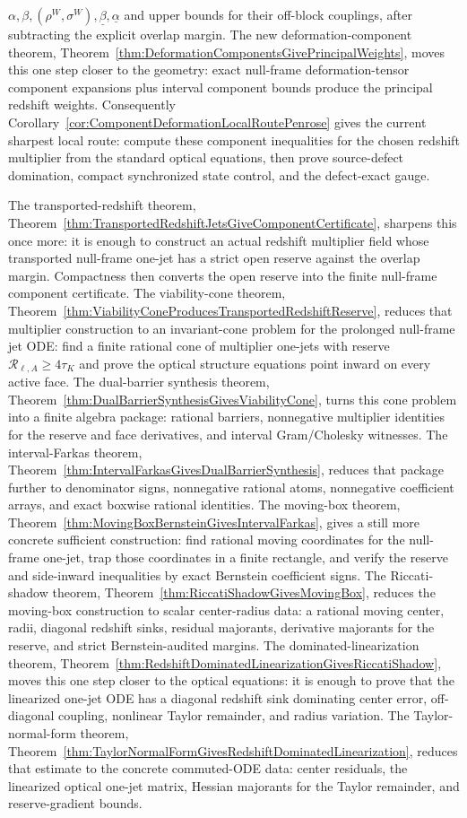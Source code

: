 $\alpha,\beta,(\rho^W,\sigma^W),\underline\beta,\underline\alpha$ and upper bounds for their off-block couplings, after subtracting the explicit overlap margin. The new deformation-component theorem, Theorem~\ref{thm:DeformationComponentsGivePrincipalWeights}, moves this one step closer to the geometry: exact null-frame deformation-tensor component expansions plus interval component bounds produce the principal redshift weights. Consequently Corollary~\ref{cor:ComponentDeformationLocalRoutePenrose} gives the current sharpest local route: compute these component inequalities for the chosen redshift multiplier from the standard optical equations, then prove source-defect domination, compact synchronized state control, and the defect-exact gauge.

The transported-redshift theorem, Theorem~\ref{thm:TransportedRedshiftJetsGiveComponentCertificate}, sharpens this once more: it is enough to construct an actual redshift multiplier field whose transported null-frame one-jet has a strict open reserve against the overlap margin. Compactness then converts the open reserve into the finite null-frame component certificate. The viability-cone theorem, Theorem~\ref{thm:ViabilityConeProducesTransportedRedshiftReserve}, reduces that multiplier construction to an invariant-cone problem for the prolonged null-frame jet ODE: find a finite rational cone of multiplier one-jets with reserve $\mathcal R_{\ell,A}\ge4\tau_K$ and prove the optical structure equations point inward on every active face. The dual-barrier synthesis theorem, Theorem~\ref{thm:DualBarrierSynthesisGivesViabilityCone}, turns this cone problem into a finite algebra package: rational barriers, nonnegative multiplier identities for the reserve and face derivatives, and interval Gram/Cholesky witnesses. The interval-Farkas theorem, Theorem~\ref{thm:IntervalFarkasGivesDualBarrierSynthesis}, reduces that package further to denominator signs, nonnegative rational atoms, nonnegative coefficient arrays, and exact boxwise rational identities. The moving-box theorem, Theorem~\ref{thm:MovingBoxBernsteinGivesIntervalFarkas}, gives a still more concrete sufficient construction: find rational moving coordinates for the null-frame one-jet, trap those coordinates in a finite rectangle, and verify the reserve and side-inward inequalities by exact Bernstein coefficient signs. The Riccati-shadow theorem, Theorem~\ref{thm:RiccatiShadowGivesMovingBox}, reduces the moving-box construction to scalar center-radius data: a rational moving center, radii, diagonal redshift sinks, residual majorants, derivative majorants for the reserve, and strict Bernstein-audited margins. The dominated-linearization theorem, Theorem~\ref{thm:RedshiftDominatedLinearizationGivesRiccatiShadow}, moves this one step closer to the optical equations: it is enough to prove that the linearized one-jet ODE has a diagonal redshift sink dominating center error, off-diagonal coupling, nonlinear Taylor remainder, and radius variation. The Taylor-normal-form theorem, Theorem~\ref{thm:TaylorNormalFormGivesRedshiftDominatedLinearization}, reduces that estimate to the concrete commuted-ODE data: center residuals, the linearized optical one-jet matrix, Hessian majorants for the Taylor remainder, and reserve-gradient bounds. 